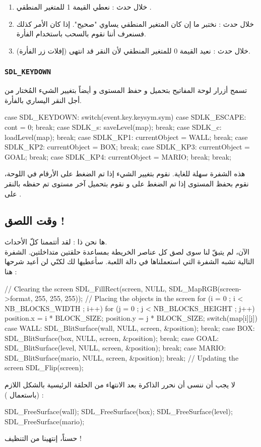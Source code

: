 \begin{enumerate}
	\item خلال حدث
	 :
	نعطي القيمة 1 للمتغير المنطقي
	.
	\item خلال حدث 
	 :
	نختبر ما إن كان المتغير المنطقي 
	يساوي "صحيح". إذا كان الأمر كذلك فسنعرف أننا نقوم بالسحب باستخدام الفأرة.
	\item  خلال حدث
	 :
	نعيد القيمة 0 للمتغير المنطقي
	لأن النقر قد انتهى (إفلات زر الفأرة).
\end{enumerate}

\subsubsection{\texttt{SDL\_KEYDOWN}}

تسمح أزرار لوحة المفاتيح بتحميل و حفظ المستوى و أيضاً بتغيير الشيء المُختار من أجل النقر اليساري بالفأرة. 

\begin{Csource}
case SDL_KEYDOWN:
switch(event.key.keysym.sym)
{
	case SDLK_ESCAPE:
		cont = 0;
		break;
	case SDLK_s:
		saveLevel(map);
		break;
	case SDLK_c:
		loadLevel(map);
		break;
	case SDLK_KP1:
		currentObject = WALL;
		break;
	case SDLK_KP2:
		currentObject = BOX;
		break;
	case SDLK_KP3:
		currentObject = GOAL;
		break;
	case SDLK_KP4:
		currentObject = MARIO;
		break;
}
break;
\end{Csource}

هذه الشفرة سهلة للغاية. نقوم بتغيير الشيء إذا تم الضغط على الأرقام في اللوحة، نقوم بحفظ المستوى إذا تم الضغط على 
و نقوم بتحميل آخر مستوى تم حفظه بالنقر على
.

\subsection{وقت اللصق !}

ها نحن ذا : لقد أتتممنا كلّ الأحداث.\\
الآن، لم يتبقّ لنا سوى لصق كل عناصر الخريطة بمساعدة حلقتين متداخلتين. الشفرة التالية تشبه الشفرة التي استعملناها في دالة اللعبة. سأعطيها لك لكنّي لن أعيد شرحها هنا :

\begin{Csource}
// Clearing the screen
SDL_FillRect(screen, NULL, SDL_MapRGB(screen->format, 255, 255, 255));
// Placing the objects in the screen
for (i = 0 ; i < NB_BLOCKS_WIDTH ; i++)
{
	for (j = 0 ; j < NB_BLOCKS_HEIGHT ; j++)
	{
		position.x = i * BLOCK_SIZE;
		position.y = j * BLOCK_SIZE;
		switch(map[i][j])
		{
			case WALL:
			SDL_BlitSurface(wall, NULL, screen, &position);
			break;
			case BOX:
			SDL_BlitSurface(box, NULL, screen, &position);
			break;
			case GOAL:
			SDL_BlitSurface(level, NULL, screen, &position);
			break;
			case MARIO:
			SDL_BlitSurface(mario, NULL, screen, &position);
			break;
		}
	}
}
// Updating the screen
SDL_Flip(screen);
\end{Csource}

لا يجب أن ننسى أن نحرر الذاكرة بعد الانتهاء من الحلقة الرئيسية بالشكل اللازم (باستعمال
) :

\begin{Csource}
SDL_FreeSurface(wall);
SDL_FreeSurface(box);
SDL_FreeSurface(level);
SDL_FreeSurface(mario);
\end{Csource}

حسناً، إنتهينا من التنظيف !
